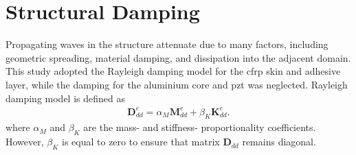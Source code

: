 \section{Structural Damping}
\label{sec:damping}

Propagating waves in the structure attenuate due to many factors, including geometric spreading, material damping, and dissipation into the adjacent domain.
This study adopted the Rayleigh damping model for the \ac{cfrp} skin and adhesive layer, while the damping for the aluminium core and \ac{pzt} was neglected.
Rayleigh damping model is defined as \cite{wandowski2017guided}
\begin{eqnarray}
	\textbf{D}_{dd}^e = \alpha_M \textbf{M}_{dd}^e + \beta_K \textbf{K}_{dd}^e.
	\label{eq:damping}
\end{eqnarray}
where \(\alpha_M\) and \(\beta_K\) are the mass- and stiffness- proportionality coefficients. However, \(\beta_K\) is equal to zero to ensure that matrix \(\textbf{D}_{dd}\) remains diagonal.